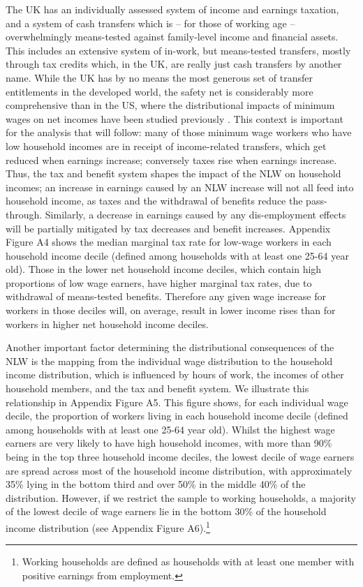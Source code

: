 The UK has an individually assessed system of income and earnings taxation, and a system of cash transfers which is -- for those of working age -- overwhelmingly means-tested against family-level income and financial assets. This includes an extensive system of in-work, but means-tested transfers, mostly through tax credits which, in the UK, are really just cash transfers by another name. While the UK has by no means the most generous set of transfer entitlements in the developed world, the safety net is considerably more comprehensive than in the US, where the distributional impacts of minimum wages on net incomes have been studied previously \citep{Dube2019}. This context is important  for the analysis that will follow: many of those minimum wage workers who have low household incomes are in receipt of income-related transfers, which get reduced when earnings increase; conversely taxes rise when earnings increase. Thus, the tax and benefit system shapes the impact of the NLW on household incomes; an increase in earnings caused by an NLW increase will not all feed into household income, as taxes and the withdrawal of benefits reduce the pass-through. Similarly, a decrease in earnings caused by any dis-employment effects will be partially mitigated by tax decreases and benefit increases. Appendix Figure A4 shows the median marginal tax rate for low-wage workers in each household income decile (defined among households with at least one 25-64 year old). Those in the lower net household income deciles, which contain high proportions of low wage earners, have higher marginal tax rates, due to withdrawal of means-tested benefits. Therefore any given wage increase for workers in those deciles will, on average, result in lower income rises than for workers in higher net household income deciles.
\par

Another important factor determining the distributional consequences of the NLW is the mapping from the individual wage distribution to the household income distribution, which is influenced by hours of work, the incomes of other household members, and the tax and benefit system. We illustrate this relationship in Appendix Figure A5. This figure shows, for each individual wage decile, the proportion of workers living in each household income decile (defined among households with at least one 25-64 year old). Whilst the highest wage earners are very likely to have high household incomes, with more than 90\% being in the top three household income deciles, the lowest decile of wage earners are spread across most of the household income distribution, with approximately 35\% lying in the bottom third and over 50\% in the middle 40\% of the distribution. However, if we restrict the sample to working households, a majority of the lowest decile of wage earners lie in the bottom 30\% of the household income distribution (see Appendix Figure A6).\footnote{Working households are defined as households with at least one member with positive earnings from employment.} \par


